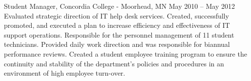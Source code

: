 Student Manager, Concordia College - Moorhead, MN
May 2010 – May 2012
Evaluated strategic direction of IT help desk services.  Created, successfully promoted, and executed a plan to increase efficiency and effectiveness of IT support operations.
Responsible for the personnel management of 11 student technicians.  Provided daily work direction and was responsible for biannual performance reviews.
Created a student employee training program to ensure the continuity and stability of the department’s policies and procedures in an environment of high employee turn-over.